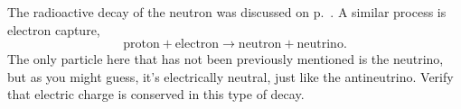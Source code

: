 The radioactive decay of the neutron was discussed on p.~\pageref{neutron-beta-decay}. A similar process is
electron capture,
\begin{equation*}
  \text{proton} + \text{electron} \rightarrow \text{neutron} + \text{neutrino}.
\end{equation*}
The only particle here that has not been previously mentioned is the neutrino, but as you might
guess, it's electrically neutral, just like the antineutrino. Verify that electric charge is
conserved in this type of decay.

